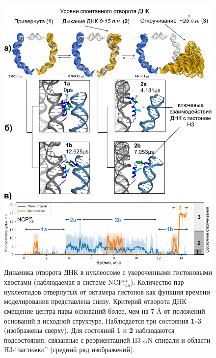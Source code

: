 \begin{figure} [H]
    \centering
    \includegraphics[width=\textwidth]{images/p2/10ms/fig2_new.pdf}
    \caption[Динамика отворота ДНК в нуклеосоме с укороченными гистоновыми хвостами]{Динамика отворота ДНК в нуклеосоме с укороченными гистоновыми хвостами (наблюдаемая в системе NCP$^{nt}_{145}$). Количество пар нуклеотидов отвернутых от октамера гистонов как функция времени моделирования представлена снизу. Критерий отворота ДНК  --  смещение центра пары оснований более, чем на 7 \AA{} от положений оснований в исходной структуре. Наблюдается три состояния \textbf{1-3} (изображены сверху). Для состояний \textbf{1} и \textbf{2} наблюдаются подсостояния, связанные с реориентацией H3 $\alpha$N спирали и области H3-``застежки'' (средний ряд изображений).}
    \label{fig:p2_3:f2_new}
\end{figure}



